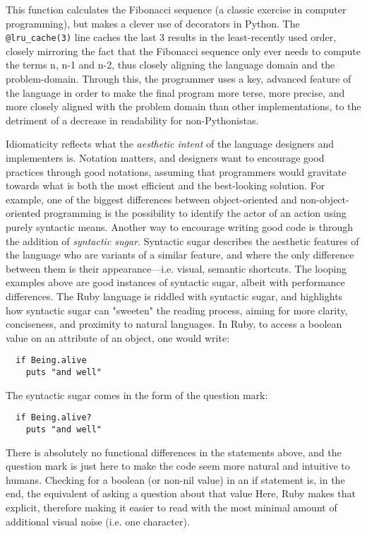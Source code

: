 \documentclass{article}
\begin{document}
This function calculates the Fibonacci sequence (a classic exercise in computer programming), but makes a clever use of decorators in Python. The \lstinline{@lru_cache(3)} line caches the last 3 results in the least-recently used order, closely mirroring the fact that the Fibonacci sequence only ever needs to compute the terms n, n-1 and n-2, thus closely aligning the language domain and the problem-domain. Through this, the programmer uses a key, advanced feature of the language in order to make the final program more terse, more precise, and more closely aligned with the problem domain than other implementations, to the detriment of a decrease in readability for non-Pythonistas.

Idiomaticity reflects what the \emph{aesthetic intent} of the language designers and implementers is. Notation matters, and designers want to encourage good practices through good notations, assuming that programmers would gravitate towards what is both the most efficient and the best-looking solution. For example, one of the biggest differences between object-oriented and non-object-oriented programming is the possibility to identify the actor of an action using purely syntactic means\cite{sustrik_250bpm_2021}. Another way to encourage writing good code is through the addition of \emph{syntactic sugar}. Syntactic sugar describes the aesthetic features of the language who are variants of a similar feature, and where the only difference between them is their appearance—i.e. visual, semantic shortcuts. The looping examples above are good instances of syntactic sugar, albeit with performance differences. The Ruby language is riddled with syntactic sugar, and highlights how syntactic sugar can "sweeten" the reading process, aiming for more clarity, conciseness, and proximity to natural languages. In Ruby, to access a boolean value on an attribute of an object, one would write:

\begin{lstlisting}
  if Being.alive
    puts "and well"
\end{lstlisting}

The syntactic sugar comes in the form of the question mark:

\begin{lstlisting}
  if Being.alive?
    puts "and well"
\end{lstlisting}

There is absolutely no functional differences in the statements above, and the question mark is just here to make the code seem more natural and intuitive to humans. Checking for a boolean (or non-nil value) in an if statement is, in the end, the equivalent of asking a question about that value Here, Ruby makes that explicit, therefore making it easier to read with the most minimal amount of additional visual noise (i.e. one character).
\end{document}
